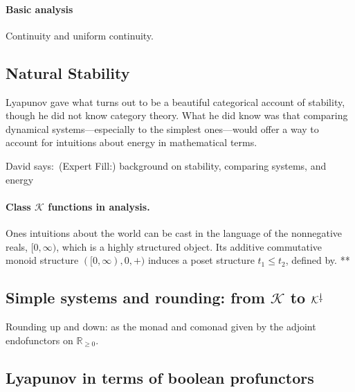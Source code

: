 \documentclass[11pt, one side, article]{memoir}
\theoremstyle{definition}
\theoremstyle{plain}
\newcommand{\cat}[1]{\mathcal{#1}}%
\newcommand{\ldag}{^{\rotatebox{180}{$\dagger$}}}
\newcommand{\rr}{\mathbb{R}}
\newcommand{\dnote}[1]{{\color{blue}David says:}~#1\quad{\color{blue}$\lozenge$}}
\newcommand{\ivlnon}{[0,\infty)}
\newcommand{\rrnon}{\rr_{\geq0}}
\newcommand{\K}{\cat{K}}
\newcommand{\Kdag}[1][0]{\K\ldag}
\begin{document}
\paragraph{Basic analysis}

Continuity and uniform continuity.

\subsection{Natural Stability}

Lyapunov gave what turns out to be a beautiful categorical account of stability, though he did not know category theory. What he did know was that comparing dynamical systems---especially to the simplest ones---would offer a way to account for intuitions about energy in mathematical terms.

\dnote{(Expert Fill:) background on stability, comparing systems, and energy}


\paragraph{Class $\K$ functions in analysis.}

Ones intuitions about the world can be cast in the language of the nonnegative reals, $\ivlnon$, which is a highly structured object. Its additive commutative monoid structure $(\ivlnon,0,+)$ induces a poset structure $t_1\leq t_2$, defined by. **

\subsection{Simple systems and rounding: from $\K$ to $\Kdag$}

Rounding up and down: as the monad and comonad given by the adjoint endofunctors on $\rrnon$.

\subsection{Lyapunov in terms of boolean profunctors}
\end{document}
